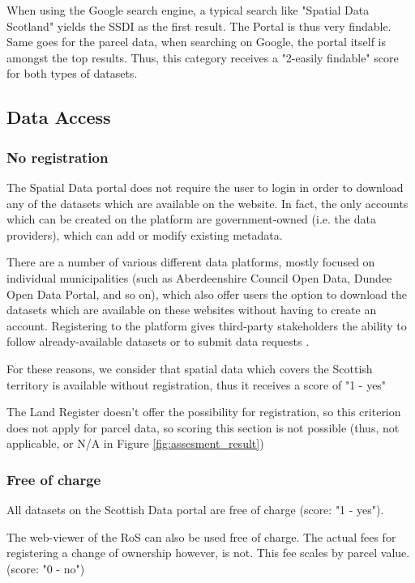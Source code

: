 When using the Google search engine, a typical search like "Spatial Data Scotland" yields the SSDI as the first result. The Portal is thus very findable. Same goes for the parcel data, when searching on Google, the portal itself is amongst the top results. Thus, this category receives a "2-easily findable" score for both types of datasets.


\subsection{Data Access}

\subsubsection{No registration}

The Spatial Data portal does not require the user to login in order to download any of the datasets which are available on the website. In fact, the only accounts which can be created on the platform are government-owned (i.e. the data providers), which can add or modify existing metadata.

There are a number of various different data platforms, mostly focused on individual municipalities (such as Aberdeenshire Council Open Data, Dundee Open Data Portal, and so on), which also offer users the option to download the datasets which are available on these websites without having to create an account. Registering to the platform gives third-party stakeholders the ability to follow already-available datasets or to submit data requests \citep{dundee_data_portal}.

For these reasons, we consider that spatial data which covers the Scottish territory is available without registration, thus it receives a score of "1 - yes"

The Land Register doesn't offer the possibility for registration, so this criterion does not apply for parcel data, so scoring this section is not possible (thus, not applicable, or N/A in Figure \ref{fig:assesment_result})

\subsubsection{Free of charge}

All datasets on the Scottish Data portal are free of charge (score: "1 - yes").

The web-viewer of the RoS can also be used free of charge. The actual fees for registering a change of ownership however, is not. This fee scales by parcel value. (score: "0 - no")


